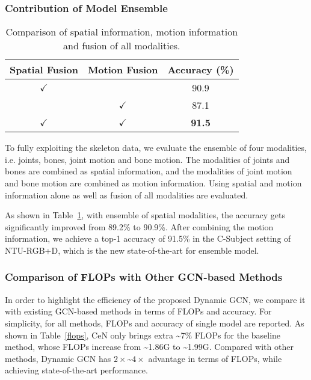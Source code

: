 \documentclass[sigconf]{acmart}
\begin{document}
\subsubsection{Contribution of Model Ensemble}




\begin{table}[t]
  \caption{Comparison of spatial information, motion information and fusion of all modalities.}
  \label{table3}
    \begin{tabular}{c|c|c}
    \toprule
    Spatial Fusion & {Motion Fusion} & Accuracy (\%)  \\
    \midrule
    $\checkmark$     &       & 90.9 \\
          & $\checkmark$     & 87.1 \\
    $\checkmark$     & $\checkmark$     & \textbf{91.5} \\
    \bottomrule
    \end{tabular}\end{table}

To fully exploiting the skeleton data, we evaluate the ensemble of four modalities, i.e. joints, bones, joint motion and bone motion. The modalities of joints and bones are combined as spatial information, and the modalities of joint motion and bone motion are combined as motion information. Using spatial and motion information alone as well as fusion of all modalities are evaluated.

As shown in Table~\ref{table3}, with ensemble of spatial modalities, the accuracy gets significantly improved from 89.2\% to 90.9\%. After combining the motion information, we achieve a top-1 accuracy of 91.5\% in the C-Subject setting of NTU-RGB+D, which is the new state-of-the-art for ensemble model.

\subsubsection{Comparison of FLOPs with Other GCN-based Methods}

In order to highlight the efficiency of the proposed Dynamic GCN, we compare it with existing GCN-based methods in terms of FLOPs and accuracy. For simplicity, for all methods, FLOPs and accuracy of single model are reported. As shown in Table~\ref{flops}, CeN only brings extra \textasciitilde7\% FLOPs for the baseline method, whose FLOPs increase from \textasciitilde1.86G to \textasciitilde1.99G. Compared with other methods, Dynamic GCN has $2\times$\textasciitilde$4\times$ advantage in terms of FLOPs, while achieving state-of-the-art performance.
\end{document}
